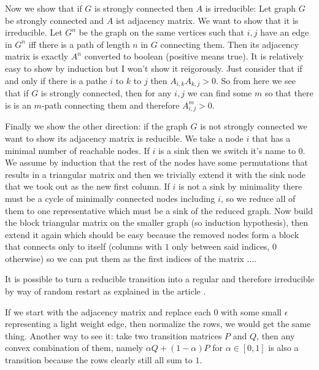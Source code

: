 \documentclass[a4paper,10pt]{article}
\theoremstyle{definition}
\theoremstyle{remark}
\theoremstyle{plain}
\begin{document}
Now we show that if $G$ is strongly connected then $A$ is irreducible:
Let graph $G$ be strongly connected and $A$ ist adjacency matrix. 
We want to show that it is irreducible.
Let $G^n$ be the graph on the same vertices such that $i,j$ have an edge in
$G^n$ iff there is a path of length $n$ in $G$ connecting them. Then its
adjacency matrix is exactly $A^n$ converted to boolean (positive means true). It
is relatively easy to show by induction but I won't show it reigorously. Just
consider that if and only if there is a pathe $i$ to $k$ to $j$ then 
$A_{i,k}A_{k,j} > 0$. So from here we see that if $G$ is strongly connected,
then for any $i,j$ we can find some $m$ so that there is is an $m$-path
connecting them and therefore $A^m_{i,j} >0$.

Finally we show the
other direction: if the graph $G$ is not strongly connected we want to show its
adjacency matrix is reducible. We take a node $i$ that has a minimal number of
reachable nodes. If $i$ is a sink then we switch it's name to $0$. We assume by
induction that the rest of the nodes have some permutations that results in a
triangular matrix and then we trivially extend it with the sink node that we
took out as the new first column. If $i$ is not a sink by minimality there must
be a cycle of minimally connected nodes including $i$, so we reduce all of them
to one representative which must be a sink of the reduced graph. Now build the
block triangular matrix on the smaller graph (so induction hypothesis), then
extend it again which should be easy because the removed nodes form a block that
connects only to itself (columns with $1$ only between said indices, $0$
otherwise) so we can put them as the first indices of the matrix $\dots$.

It is possible to turn a reducible transition into a regular and therefore irreducible by way of
random restart as explained in the article \textcite{cowen2017network}.

If we start with the adjacency matrix and replace each $0$ with some small
$\epsilon$ representing a light weight edge, then normalize the rows, we would
get the same thing. Another way to see it: take two transition matrices $P$ and
$Q$, then any convex combination of them, namely $\alpha Q + (1-\alpha)P$ for
$\alpha \in [0,1]$ is also a transition because the rows clearly still all sum
to $1$.
\end{document}
